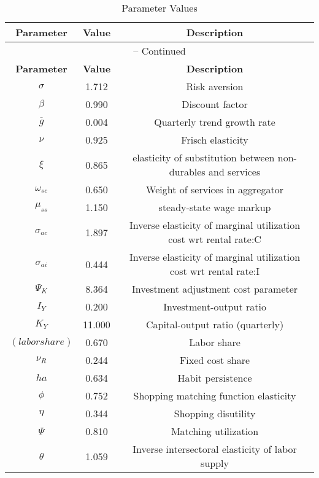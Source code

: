 \begin{center}
\begin{longtable}{ccc}
\caption{Parameter Values}\\%
\toprule%
\multicolumn{1}{c}{\textbf{Parameter}} &
\multicolumn{1}{c}{\textbf{Value}} &
 \multicolumn{1}{c}{\textbf{Description}}\\%
\midrule%
\endfirsthead
\multicolumn{3}{c}{{\tablename} \thetable{} -- Continued}\\%
\midrule%
\multicolumn{1}{c}{\textbf{Parameter}} &
\multicolumn{1}{c}{\textbf{Value}} &
  \multicolumn{1}{c}{\textbf{Description}}\\%
\midrule%
\endhead
${\sigma}$ 	 & 	 1.712 	 & 	 Risk aversion\\
${\beta}$ 	 & 	 0.990 	 & 	 Discount factor\\
${\overline{g}}$ 	 & 	 0.004 	 & 	 Quarterly trend growth rate\\
$\nu$ 	 & 	 0.925 	 & 	 Frisch elasticity\\
$\xi$ 	 & 	 0.865 	 & 	 elasticity of substitution between non-durables and services\\
$\omega_{sc}$ 	 & 	 0.650 	 & 	 Weight of services in aggregator\\
$\mu_{ss}$ 	 & 	 1.150 	 & 	 steady-state wage markup\\
${\sigma_{ac}}$ 	 & 	 1.897 	 & 	 Inverse elasticity of marginal utilization cost wrt rental rate:C\\
${\sigma_{ai}}$ 	 & 	 0.444 	 & 	 Inverse elasticity of marginal utilization cost wrt rental rate:I\\
${\Psi_{K}}$ 	 & 	 8.364 	 & 	 Investment adjustment cost parameter\\
${I_Y}$ 	 & 	 0.200 	 & 	 Investment-output ratio\\
${K_Y}$ 	 & 	 11.000 	 & 	 Capital-output ratio (quarterly)\\
$(labor share)$ 	 & 	 0.670 	 & 	 Labor share\\
${\nu_R}$ 	 & 	 0.244 	 & 	 Fixed cost share\\
${ha}$ 	 & 	 0.634 	 & 	 Habit persistence\\
${\phi}$ 	 & 	 0.752 	 & 	 Shopping matching function elasticity\\
${\eta}$ 	 & 	 0.344 	 & 	 Shopping disutility\\
${\Psi}$ 	 & 	 0.810 	 & 	 Matching utilization\\
${\theta}$ 	 & 	 1.059 	 & 	 Inverse intersectoral elasticity of labor supply\\

\end{longtable}
\end{center}
